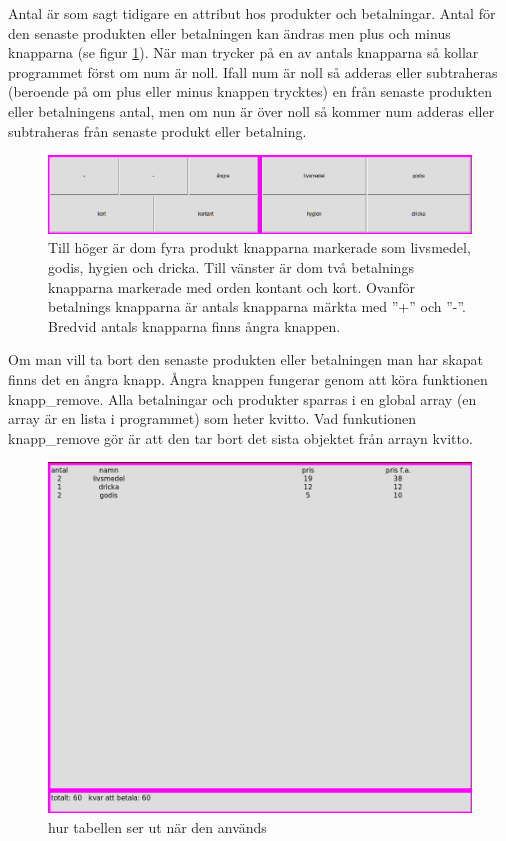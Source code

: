 \documentclass[a4paper, 12pt]{article}
\begin{document}
Antal är som sagt tidigare en attribut hos produkter och betalningar. Antal för den senaste produkten eller betalningen kan ändras men plus och minus knapparna (se figur \ref{fig:3alt}).
När man trycker på en av antals knapparna så kollar programmet först om num är noll. Ifall num är noll så adderas eller subtraheras (beroende på om plus eller minus knappen trycktes) en från senaste produkten eller betalningens antal, men om nun är över noll så kommer num adderas eller subtraheras från senaste produkt eller betalning. 


\begin{figure}[h!]
  \includegraphics[width=\linewidth]{img/3alt.png}
  \caption{
	  Till höger är dom fyra produkt knapparna markerade som livsmedel, godis, hygien och dricka.
	  Till vänster är dom två betalnings knapparna markerade med orden kontant och kort.
	  Ovanför betalnings knapparna är antals knapparna märkta med ''+'' och ''-''.
	  Bredvid antals knapparna finns ångra knappen. 
	}
  \label{fig:3alt}
\end{figure}


Om man vill ta bort den senaste produkten eller betalningen man har skapat finns det en ångra knapp.
Ångra knappen fungerar genom att köra funktionen knapp\_remove. 
Alla betalningar och produkter sparras i en global array (en array är en lista i programmet) som heter kvitto. Vad funkutionen knapp\_remove gör är att den tar bort det sista objektet från arrayn kvitto.

\begin{figure}[t!]
  \includegraphics[width=\linewidth]{img/kvitto_disp.png}
  \caption{ hur tabellen ser ut när den används}
  \label{fig:kdisp}
\end{figure}
\end{document}
